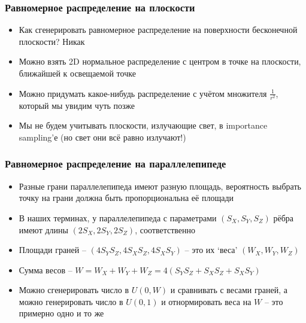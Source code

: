 \documentclass[10pt]{beamer}
\begin{document}
\begin{frame}
\frametitle{Равномерное распределение на плоскости}
\begin{itemize}
\item Как сгенерировать равномерное распределение на поверхности бесконечной плоскости? \pause Никак
\pause
\item Можно взять 2D нормальное распределение с центром в точке на плоскости, ближайшей к освещаемой точке
\pause
\item Можно придумать какое-нибудь распределение с учётом множителя \begin{math}\frac{1}{r^2}\end{math}, который мы увидим чуть позже
\pause
\item Мы не будем учитывать плоскости, излучающие свет, в importance sampling'е (но свет они всё равно излучают!)
\end{itemize}
\end{frame}

\begin{frame}
\frametitle{Равномерное распределение на параллелепипеде}
\begin{itemize}
\item Разные грани параллелепипеда имеют разную площадь, вероятность выбрать точку на грани должна быть пропорциональна её площади
\pause
\item В наших терминах, у параллелепипеда с параметрами \begin{math}(S_X,S_Y,S_Z)\end{math} рёбра имеют длины \begin{math}(2S_X, 2S_Y, 2S_Z)\end{math}, соответственно
\pause
\item Площади граней -- \begin{math}(4 S_Y S_Z,4 S_X S_Z,4 S_X S_Y)\end{math} -- это их `веса' \begin{math}(W_X,W_Y,W_Z)\end{math}
\pause
\item Сумма весов -- \begin{math}W = W_X+W_Y+W_Z=4(S_YS_Z+S_XS_Z+S_XS_Y)\end{math}
\pause
\item Можно сгенерировать число в \begin{math}U(0, W)\end{math} и сравнивать с весами граней, а можно генерировать число в \begin{math}U(0,1)\end{math} и отнормировать веса на \begin{math}W\end{math} -- это примерно одно и то же
\end{itemize}
\end{frame}
\end{document}
